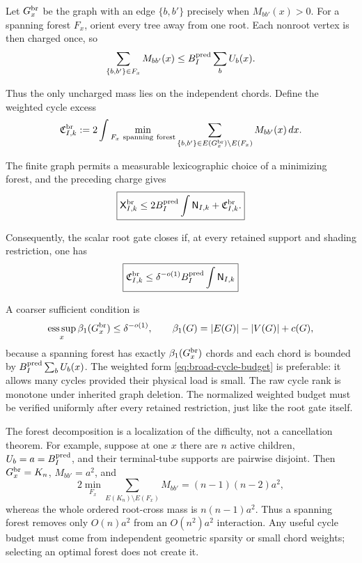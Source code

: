 \documentclass[11pt]{article}
\begin{document}
Let \(G_x^{\rm br}\) be the graph with an edge \(\{b,b'\}\) precisely when
\(M_{bb'}(x)>0\).  For a spanning forest \(F_x\), orient every tree away from
one root.  Each nonroot vertex is then charged once, so
\[
 \sum_{\{b,b'\}\in F_x}M_{bb'}(x)
 \le B_I^{\rm pred}\sum_bU_b(x).
\]

Thus the only uncharged mass lies on the independent chords.  Define the
weighted cycle excess
\begin{equation}\label{eq:broad-weighted-cycle-excess}
 \mathfrak C_{I,k}^{\rm br}
 :=2\int
 \min_{F_x\ {\rm spanning\ forest}}
 \sum_{\{b,b'\}\in E(G_x^{\rm br})\setminus E(F_x)}
 M_{bb'}(x)\,dx.
\end{equation}

The finite graph permits a measurable lexicographic choice of a minimizing
forest, and the preceding charge gives
\begin{equation}\label{eq:broad-cycle-rank-reduction}
 \boxed{
 \mathsf X_{I,k}^{\rm br}
 \le
 2B_I^{\rm pred}\int\mathsf N_{I,k}
 +\mathfrak C_{I,k}^{\rm br}.}
\end{equation}

Consequently, the scalar root gate closes if, at every retained support and
shading restriction, one has
\begin{equation}\label{eq:broad-cycle-budget}
 \boxed{
 \mathfrak C_{I,k}^{\rm br}
 \le\delta^{-o(1)}B_I^{\rm pred}
       \int\mathsf N_{I,k}}
\end{equation}

A coarser sufficient condition is
\begin{equation}\label{eq:broad-cycle-rank-condition}
 \operatorname*{ess\,sup}_x\beta_1(G_x^{\rm br})
 \le\delta^{-o(1)},
 \qquad
 \beta_1(G)=|E(G)|-|V(G)|+c(G),
\end{equation}
because a spanning forest has exactly \(\beta_1(G_x^{\rm br})\) chords and
each chord is bounded by
\(B_I^{\rm pred}\sum_bU_b(x)\).  The weighted form
\eqref{eq:broad-cycle-budget} is preferable: it allows many cycles provided
their physical load is small.  The raw cycle rank is monotone under inherited
graph deletion.  The normalized weighted budget must be verified uniformly
after every retained restriction, just like the root gate itself.

The forest decomposition is a localization of the difficulty, not a
cancellation theorem.  For example, suppose at one \(x\) there are \(n\)
active children, \(U_b=a=B_I^{\rm pred}\), and their terminal-tube supports
are pairwise disjoint.  Then \(G_x^{\rm br}=K_n\),
\(M_{bb'}=a^2\), and
\[
 2\min_{F_x}\sum_{E(K_n)\setminus E(F_x)}M_{bb'}
 =(n-1)(n-2)a^2,
\]
whereas the whole ordered root-cross mass is \(n(n-1)a^2\).  Thus a spanning
forest removes only \(O(n)a^2\) from an \(O(n^2)a^2\) interaction.  Any useful
cycle budget must come from independent geometric sparsity or small chord
weights; selecting an optimal forest does not create it.
\end{document}
